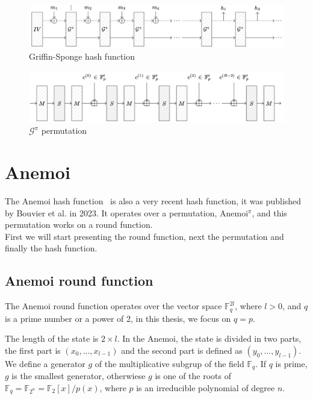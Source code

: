 \begin{figure}[htbp]
    \centering
    \includegraphics[width=\textwidth]{graphics/griffin-hash.png}
    \caption{Griffin-Sponge hash function~\cite{grassi2022horst}}
    \label{fig:griffin-hash}
\end{figure}

\begin{figure}[htbp]
    \centering
    \includegraphics[width=\textwidth]{graphics/griffin-permutation.png}
    \caption{$\mathcal{G}^\pi$ permutation~\cite{grassi2022horst}}
    \label{fig:griffin-permutation}
\end{figure}

\section{Anemoi}
\label{sec:anemoi}
The Anemoi hash function~\cite{bouvier2023new} is also a very recent hash function, it was published by Bouvier et al. in 2023. It operates over a permutation, Anemoi$^\pi$, and this permutation works on a round function.\\
First we will start presenting the round function, next the permutation and finally the hash function.

\subsection*{Anemoi round function}
The Anemoi round function operates over the vector space $\mathbb{F}_q^{2l}$, where $l>0$, and $q$ is a prime number or a power of 2, in this thesis, we focus on $q=p$.

The length of the state is $2\times l$. In the Anemoi, the state is divided in two parts, the first part is $\left(x_0,\dots,x_{l-1}\right)$ and the second part is defined as $\left(y_0,\dots,y_{l-1}\right)$. We define a generator $g$ of the multiplicative subgrup of the field $\mathbb{F}_q$. If $q$ is prime, $g$ is the smallest generator, otherwiese $g$ is one of the roots of $\mathbb{F}_q = \mathbb{F}_{2^n}=\mathbb{F}_2[x]/p(x)$, where $p$ is an irreducible polynomial of degree $n$.

